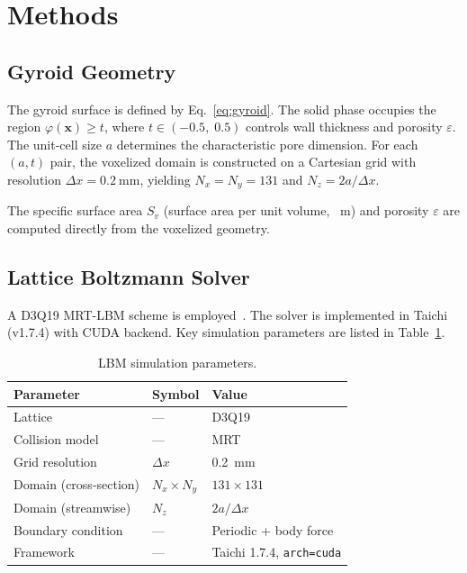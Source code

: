 \section{Methods}\label{sec:methods}

\subsection{Gyroid Geometry}\label{sec:geom}

The gyroid surface is defined by Eq.~\eqref{eq:gyroid}.
The solid phase occupies the region $\varphi(\mathbf{x}) \ge t$,
where $t \in (-0.5,\; 0.5)$ controls wall thickness and porosity
$\varepsilon$.  The unit-cell size $a$ determines the characteristic
pore dimension.  For each $(a, t)$ pair, the voxelized domain is
constructed on a Cartesian grid with resolution $\Delta x = \SI{0.2}{\milli\meter}$,
yielding $N_x = N_y = 131$ and $N_z = 2a/\Delta x$.

The specific surface area $S_v$ (surface area per unit volume, \si{\per\meter})
and porosity $\varepsilon$ are computed directly from the voxelized geometry.

\subsection{Lattice Boltzmann Solver}\label{sec:lbm}

A D3Q19 MRT-LBM scheme is employed~\cite{ref_mrt_lbm}.
The solver is implemented in Taichi (v1.7.4) with CUDA backend.
Key simulation parameters are listed in Table~\ref{tab:lbm_params}.

\begin{table}[htbp]
\caption{LBM simulation parameters.}\label{tab:lbm_params}
\centering
\begin{tabular}{@{}lll@{}}
\toprule
Parameter & Symbol & Value \\
\midrule
Lattice & --- & D3Q19 \\
Collision model & --- & MRT \\
Grid resolution & $\Delta x$ & \SI{0.2}{\milli\meter} \\
Domain (cross-section) & $N_x \times N_y$ & $131 \times 131$ \\
Domain (streamwise) & $N_z$ & $2a/\Delta x$ \\
Boundary condition & --- & Periodic + body force \\
Framework & --- & Taichi 1.7.4, \texttt{arch=cuda} \\
\bottomrule
\end{tabular}
\end{table}

